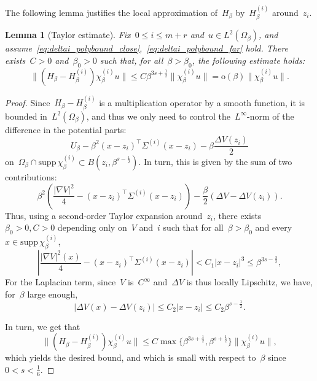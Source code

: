 \documentclass[10pt]{article}
\newcommand{\1}{\mathbbm 1}
\newcommand{\deltaScalingExp}{s}
\renewcommand{\o}{\mathrm{o}}
\newtheorem{lemma}{Lemma}
\begin{document}
    The following lemma justifies the local approximation of~$H_\beta$ by~$H_\beta^{(i)}$ around~$z_i$.
    \begin{lemma}[Taylor estimate]
        \label{lemma:taylor_bound}
        Fix~$0\leq i \leq m+r$ and~$u\in L^2(\Omega_\beta)$, and assume~\eqref{eq:deltai_polybound_close},~\eqref{eq:deltai_polybound_far} hold.
        There exists~$C>0$ and~$\beta_0>0$ such that, for all~$\beta>\beta_0$, the following estimate holds:
        \begin{equation}
            \label{eq:taylor_bound_witten}
            \|(H_\beta-H_\beta^{(i)})\chi_\beta^{(i)} u\| \leq C\beta^{3\deltaScalingExp+\frac12}\|\chi_\beta^{(i)}u\| = \o(\beta)\|\chi_\beta^{(i)}u\|.
        \end{equation}
    \end{lemma}
    \begin{proof}
        Since~$H_\beta-H_\beta^{(i)}$ is a multiplication operator by a smooth function, it is bounded in~$L^2(\Omega_\beta)$, and thus we only need to control the~$L^\infty$-norm of the difference in the potential parts:
       ~$$U_\beta - \beta^2(x-z_i)^\intercal \Sigma^{(i)}(x-z_i) - \beta \frac{\Delta V(z_i)}2$$ on~$\Omega_\beta \cap\mathrm{supp}\,\chi_\beta^{(i)} \subset B(z_i,\beta^{\deltaScalingExp-\frac12})$.
        In turn, this is given by the sum of two contributions:
       ~$$ \beta^2\left(\frac{|\nabla V|^2}4 - (x-z_i)^\intercal \Sigma^{(i)}(x-z_i) \right) - \frac\beta2(\Delta V - \Delta V(z_i)).$$
        Thus, using a second-order Taylor expansion around~$z_i$, there exists~$\beta_0>0, C>0$ depending only on~$V$ and~$i$ such that for all~$\beta>\beta_0$ and every~$x\in \mathrm{supp}\,\chi_\beta^{(i)}$, 
       ~$$\left|\frac{|\nabla V|^2(x)}4 - (x-z_i)^\intercal \Sigma^{(i)}(x-z_i)\right| < C_1 |x-z_i|^3 \leq \beta^{3\deltaScalingExp-\frac32},$$
        For the Laplacian term, since~$V$ is~$C^\infty$ and~$\Delta V$ is thus locally Lipschitz, we have, for~$\beta$ large enough,
       ~$$ \left| \Delta V(x) - \Delta V(z_i)\right| \leq C_2|x-z_i|\leq C_2 \beta^{\deltaScalingExp-\frac12}.$$

        In turn, we get that 
       ~$$\|(H_\beta-H_\beta^{(i)})\chi_\beta^{(i)} u\| \leq C\max\{\beta^{3\deltaScalingExp+\frac12},\beta^{\deltaScalingExp+\frac12}\}\|\chi_\beta^{(i)}u\|,$$
        which yields the desired bound, and which is small with respect to~$\beta$ since~$0<\deltaScalingExp<\frac16$.
    \end{proof}
\end{document}

